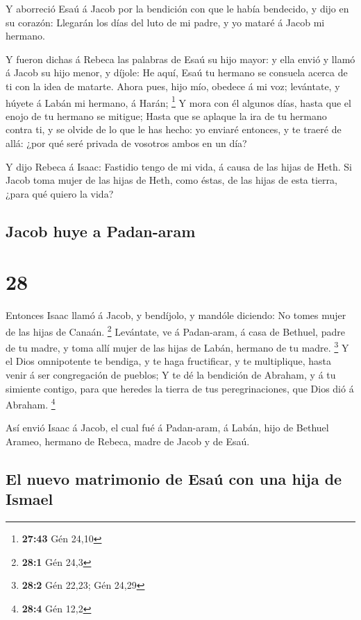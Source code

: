  Y aborreció Esaú á Jacob por la bendición con que le
había bendecido, y dijo en su corazón: Llegarán los días del luto de mi
padre, y yo mataré á Jacob mi hermano.

 Y fueron dichas á Rebeca las palabras de Esaú su hijo
mayor: y ella envió y llamó á Jacob su hijo menor, y díjole: He aquí,
Esaú tu hermano se consuela acerca de ti con la idea de matarte.
 Ahora pues, hijo mío, obedece á mi voz; levántate, y
húyete á Labán mi hermano, á Harán; \footnote{\textbf{27:43} Gén 24,10}
 Y mora con él algunos días, hasta que el enojo de tu
hermano se mitigue;  Hasta que se aplaque la ira de tu
hermano contra ti, y se olvide de lo que le has hecho: yo enviaré
entonces, y te traeré de allá: ¿por qué seré privada de vosotros ambos
en un día?

 Y dijo Rebeca á Isaac: Fastidio tengo de mi vida, á
causa de las hijas de Heth. Si Jacob toma mujer de las hijas de Heth,
como éstas, de las hijas de esta tierra, ¿para qué quiero la vida?

\hypertarget{jacob-huye-a-padan-aram}{%
\subsection{Jacob huye a Padan-aram}\label{jacob-huye-a-padan-aram}}

\hypertarget{section-27}{%
\section{28}\label{section-27}}

 Entonces Isaac llamó á Jacob, y bendíjolo, y mandóle
diciendo: No tomes mujer de las hijas de Canaán. \footnote{\textbf{28:1}
  Gén 24,3}  Levántate, ve á Padan-aram, á casa de
Bethuel, padre de tu madre, y toma allí mujer de las hijas de Labán,
hermano de tu madre. \footnote{\textbf{28:2} Gén 22,23; Gén 24,29}
 Y el Dios omnipotente te bendiga, y te haga fructificar,
y te multiplique, hasta venir á ser congregación de pueblos;
 Y te dé la bendición de Abraham, y á tu simiente contigo,
para que heredes la tierra de tus peregrinaciones, que Dios dió á
Abraham. \footnote{\textbf{28:4} Gén 12,2}

 Así envió Isaac á Jacob, el cual fué á Padan-aram, á
Labán, hijo de Bethuel Arameo, hermano de Rebeca, madre de Jacob y de
Esaú.

\hypertarget{el-nuevo-matrimonio-de-esauxfa-con-una-hija-de-ismael}{%
\subsection{El nuevo matrimonio de Esaú con una hija de
Ismael}\label{el-nuevo-matrimonio-de-esauxfa-con-una-hija-de-ismael}}

